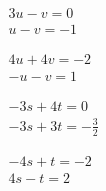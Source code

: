 \begin{exercise}
\begin{Parts}
\begin{reduce}
\item\(\begin{array}{l} 3u -v=0\\ u -v=-1 \end{array}\)
\end{reduce}

\item\(\begin{array}{l} 4u +4v=-2\\ -u -v=1 \end{array}\)

\item\(\begin{array}{l} -3s +4t=0\\ -3s +3t=-\frac32 \end{array}\)

\item\(\begin{array}{l} -4s +t=-2\\ 4s -t=2 \end{array}\)

\end{Parts}
\end{exercise}





